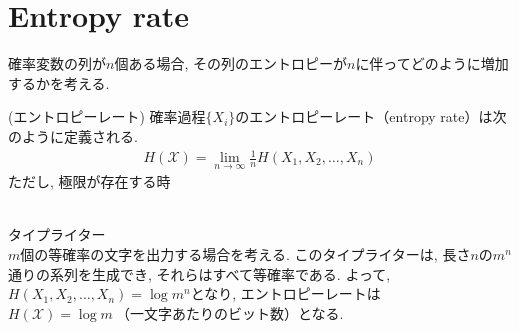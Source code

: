 \documentclass[a4j]{jsarticle}
\begin{document}





\section{Entropy rate}

確率変数の列が$n$個ある場合, その列のエントロピーが$n$に伴ってどのように増加するかを考える.\\

\begin{itembox}[l]{ (エントロピーレート)}
	確率過程$\{X_i\}$のエントロピーレート（entropy rate）は次のように定義される.
	\begin{align}
		H(\mathcal{X}) = \lim_{n \rightarrow \infty} \frac{1}{n}H(X_1, X_2, \ldots, X_n)
	\end{align}
	ただし, 極限が存在する時
\end{itembox}\\

 タイプライター\\

$m$個の等確率の文字を出力する場合を考える. このタイプライターは, 長さ$n$の$m^n$通りの系列を生成でき, それらはすべて等確率である. よって, $H(X_1, X_2, \ldots, X_n) = \log m^n$となり, エントロピーレートは$H(\mathcal{X}) = \log m \: \mbox{（一文字あたりのビット数）}$となる.\\
\end{document}
